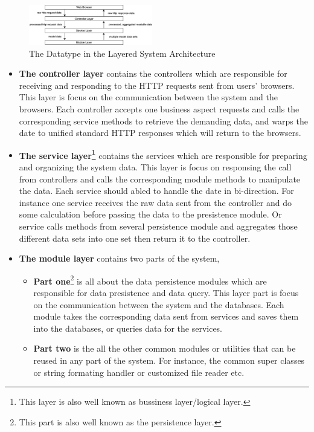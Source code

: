 \documentclass[conference]{IEEEtran}
\begin{document}
\begin{figure}[!ht]
	\centering
	\includegraphics[width=0.48\textwidth]{arch-dataflow.png}
	\caption{The Datatype in the Layered System Architecture}
	\label{fig:arch-dataflow}
\end{figure}

\begin{itemize}
	\item[1] \textbf{The controller layer} contains the controllers which are responsible for receiving and responding to the HTTP requests sent from users' browsers.
		This layer is focus on the communication between the system and the browsers.
		Each controller accepts one business aspect requests and calls the corresponding service methods to retrieve the demanding data,
		and warps the date to unified standard HTTP responses which will return to the browsers.
	\item[2] \textbf{The service layer\footnote{This layer is also well known as bussiness layer/logical layer.}} contains the services which are responsible for preparing and organizing the system data.
		This layer is focus on responsing the call from controllers and calls the corresponding module methods to manipulate the data.
		Each service should abled to handle the date in bi-direction. For instance one service receives the raw data sent from the controller and do some calculation before passing the data to the presistence module.
		Or service calls methods from several persistence module and aggregates those different data sets into one set then return it to the controller.
	\item[3] \textbf{The module layer} contains two parts of the system,
		\begin{itemize}
			\item \textbf{Part one}\footnote{This part is also well known as the persistence layer.} is all about the data persistence modules which are responsible for data presistence and data query.
			      This layer part is focus on the communication between the system and the databases.
			      Each module takes the corresponding data sent from services and saves them into the databases, or queries data for the services.
			\item \textbf{Part two} is the all the other common modules or utilities that can be reused in any part of the system.
			      For instance, the common super classes or string formating handler or customized file reader etc.
		\end{itemize}

\end{itemize}
\end{document}
